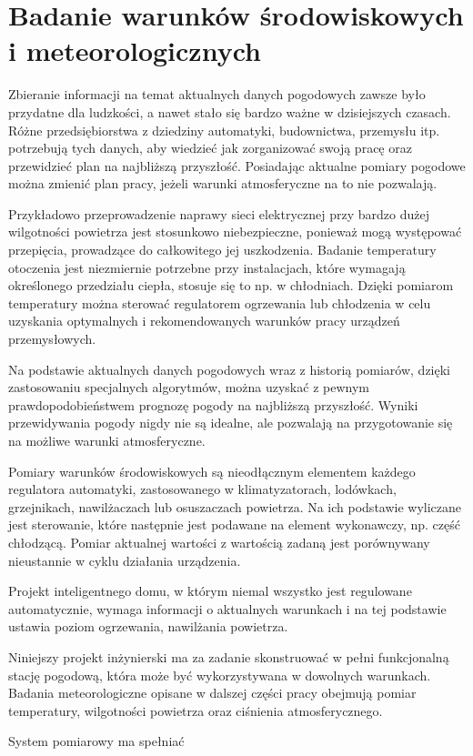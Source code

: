\chapter{Badanie warunków środowiskowych i meteorologicznych}
Zbieranie informacji na temat aktualnych danych pogodowych zawsze było przydatne dla ludzkości, a nawet stało się bardzo ważne w dzisiejszych czasach. Różne przedsiębiorstwa z dziedziny automatyki, budownictwa, przemysłu itp. potrzebują tych danych, aby wiedzieć jak zorganizować swoją pracę oraz przewidzieć plan na najbliższą przyszłość. Posiadając aktualne pomiary pogodowe można zmienić plan pracy, jeżeli warunki atmosferyczne na to nie pozwalają.

Przykładowo przeprowadzenie naprawy sieci elektrycznej przy bardzo dużej wilgotności powietrza jest stosunkowo niebezpieczne, ponieważ mogą występować przepięcia, prowadzące do całkowitego jej uszkodzenia. Badanie temperatury otoczenia jest niezmiernie potrzebne przy instalacjach, które wymagają określonego przedziału ciepła, stosuje się to np. w chłodniach. Dzięki pomiarom temperatury można sterować regulatorem ogrzewania lub chłodzenia w celu uzyskania optymalnych i rekomendowanych warunków pracy urządzeń przemysłowych.

Na podstawie aktualnych danych pogodowych wraz z historią pomiarów, dzięki zastosowaniu specjalnych algorytmów, można uzyskać z pewnym prawdopodobieństwem prognozę pogody na najbliższą przyszłość. Wyniki przewidywania pogody nigdy nie są idealne, ale pozwalają na przygotowanie się na możliwe warunki atmosferyczne.

Pomiary warunków środowiskowych są nieodłącznym elementem każdego regulatora automatyki, zastosowanego w klimatyzatorach, lodówkach, grzejnikach, nawilżaczach lub osuszaczach powietrza. Na ich podstawie wyliczane jest sterowanie, które następnie jest podawane na element wykonawczy, np. część chłodzącą. Pomiar aktualnej wartości z wartością zadaną jest porównywany nieustannie w cyklu działania urządzenia.

Projekt inteligentnego domu, w którym niemal wszystko jest regulowane automatycznie, wymaga informacji o aktualnych warunkach i na tej podstawie ustawia poziom ogrzewania, nawilżania powietrza.

Niniejszy projekt inżynierski ma za zadanie skonstruować w pełni funkcjonalną stację pogodową, która może być wykorzystywana w dowolnych warunkach. Badania meteorologiczne opisane w dalszej części pracy obejmują pomiar temperatury, wilgotności powietrza oraz ciśnienia atmosferycznego.

System pomiarowy ma spełniać 
